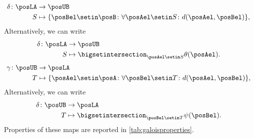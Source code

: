 %
\begin{equation}
    \label{eq:galoisdelta}
    \begin{aligned}
        \delta \colon \posLA & \to \posUB \\
        S                    & \mapsto \{\posBel\setin \posB \colon \forall {\posAel\setin S}\colon d(\posAel,\posBel)\},
    \end{aligned}
\end{equation}
Alternatively, we can write
\begin{equation}
    \begin{aligned}
        \delta\colon \posLA & \to \posUB \\
        S                   & \mapsto \bigsetintersection_{\posAel\setin S}\theta(\posAel).
    \end{aligned}
\end{equation}
%
\begin{equation}
    \label{eq:galoisgamma}
    \begin{aligned}
        \gamma \colon \posUB & \to \posLA \\
        T                    & \mapsto \{\posAel\setin \posA \colon \forall {\posBel\setin T}\colon d(\posAel,\posBel)\},
    \end{aligned}
\end{equation}
Alternatively, we can write
\begin{equation}
    \begin{aligned}
        \delta\colon \posUB & \to \posLA \\
        T                   & \mapsto \bigsetintersection_{\posBel\setin T}\psi(\posBel).
    \end{aligned}
\end{equation}
%
Properties of these maps are reported in \cref{tab:galoisproperties}.

